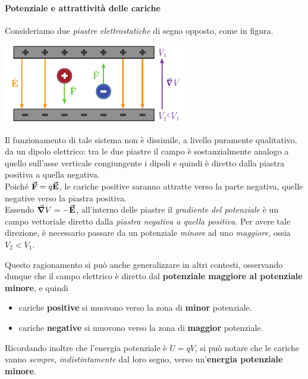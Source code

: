 \paragraph{Potenziale e attrattività delle cariche}%
\begin{examplewt}
	Consideriamo due \textit{piastre elettrostatiche} di segno opposto, come in figura.
	\begin{center}
		\includegraphics[width=0.6\textwidth]{images/chp3armature.pdf}
	\end{center}
	Il funzionamento di tale sistema non è dissimile, a livello puramente qualitativo, da un dipolo elettrico: tra le due piastre il campo è sostanzialmente analogo a quello sull'asse verticale congiungente i dipoli e quindi è diretto dalla piastra positiva a quella negativa.\\
	Poiché $\vb*{\va{F}}=q\vb*{\va{E}}$, le cariche positive saranno attratte verso la parte negativa, quelle negative verso la piastra positiva.\\
	Essendo $\grad{V}=-\vb*{\va{E}}$, all'interno delle piastre il \textit{gradiente del potenziale} è un campo vettoriale diretto dalla \textit{piastra negativa a quella positiva}. Per avere tale direzione, è necessario passare da un potenziale \textit{minore} ad uno \textit{maggiore}, ossia $V_2<V_1$.
\end{examplewt}
Questo ragionamento si può anche generalizzare in altri contesti, osservando dunque che il campo elettrico è diretto dal \textbf{potenziale maggiore al potenziale minore}, e quindi
\begin{itemize}
	\item cariche \textbf{positive} si muovono verso la zona di \textbf{minor} potenziale.
	\item cariche \textbf{negative} si muovono verso la zona di \textbf{maggior} potenziale.
\end{itemize}
Ricordando inoltre che l'energia potenziale è $U=qV$, si può notare che le cariche vanno \textit{sempre}, \textit{indistintamente} dal loro segno, verso un'\textbf{energia potenziale minore}.
